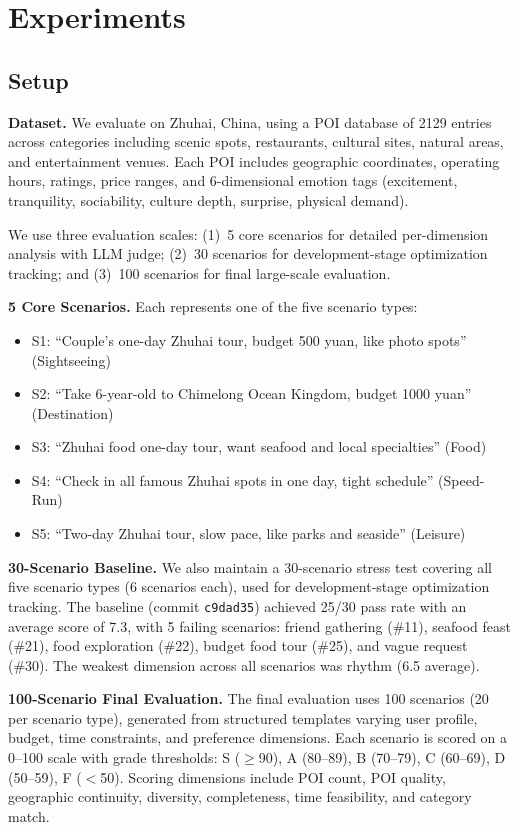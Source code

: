\section{Experiments}
\label{sec:experiments}

\subsection{Setup}

\textbf{Dataset.} We evaluate on Zhuhai, China, using a POI database of 2129 entries across categories including scenic spots, restaurants, cultural sites, natural areas, and entertainment venues. Each POI includes geographic coordinates, operating hours, ratings, price ranges, and 6-dimensional emotion tags (excitement, tranquility, sociability, culture depth, surprise, physical demand).

We use three evaluation scales: (1)~5 core scenarios for detailed per-dimension analysis with LLM judge; (2)~30 scenarios for development-stage optimization tracking; and (3)~100 scenarios for final large-scale evaluation.

\textbf{5 Core Scenarios.} Each represents one of the five scenario types:
\begin{itemize}[leftmargin=*]
    \item S1: ``Couple's one-day Zhuhai tour, budget 500 yuan, like photo spots'' (Sightseeing)
    \item S2: ``Take 6-year-old to Chimelong Ocean Kingdom, budget 1000 yuan'' (Destination)
    \item S3: ``Zhuhai food one-day tour, want seafood and local specialties'' (Food)
    \item S4: ``Check in all famous Zhuhai spots in one day, tight schedule'' (Speed-Run)
    \item S5: ``Two-day Zhuhai tour, slow pace, like parks and seaside'' (Leisure)
\end{itemize}

\textbf{30-Scenario Baseline.} We also maintain a 30-scenario stress test covering all five scenario types (6 scenarios each), used for development-stage optimization tracking. The baseline (commit \texttt{c9dad35}) achieved 25/30 pass rate with an average score of 7.3, with 5 failing scenarios: friend gathering (\#11), seafood feast (\#21), food exploration (\#22), budget food tour (\#25), and vague request (\#30). The weakest dimension across all scenarios was rhythm (6.5 average).

\textbf{100-Scenario Final Evaluation.} The final evaluation uses 100 scenarios (20 per scenario type), generated from structured templates varying user profile, budget, time constraints, and preference dimensions. Each scenario is scored on a 0--100 scale with grade thresholds: S ($\geq$90), A (80--89), B (70--79), C (60--69), D (50--59), F ($<$50). Scoring dimensions include POI count, POI quality, geographic continuity, diversity, completeness, time feasibility, and category match.

